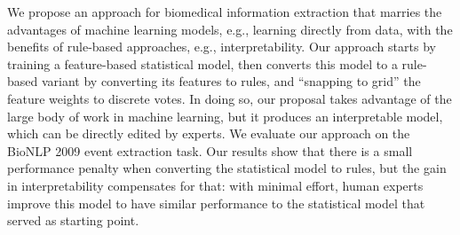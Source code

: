 We propose an approach for biomedical information extraction that marries the advantages of machine learning models, e.g., learning directly from data, with the benefits of rule-based approaches, e.g., interpretability. Our approach starts by training a feature-based statistical model, then converts this model to a rule-based variant by converting its features to rules, and ``snapping to grid'' the feature weights to discrete votes. In doing so, our proposal takes advantage of the large body of work in machine learning, but it produces an interpretable model, which can be directly edited by experts. We evaluate our approach on the BioNLP 2009 event extraction task. Our results show that there is a small performance penalty when converting the statistical model to rules, but the gain in interpretability compensates for that: with minimal effort, human experts improve this model to have similar performance to the statistical model that served as starting point.
